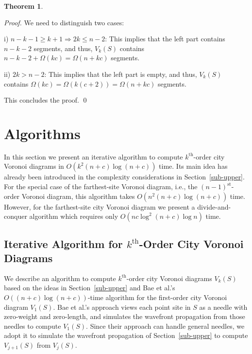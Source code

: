 \documentclass[11pt]{llncs}
\newtheorem{Theorem}{Theorem}
\newcommand{\kth}{\ensuremath{k^{\mathrm{th}}}\xspace}
\newcommand{\kthorder}{\kth-order\xspace}
\begin{document}
\begin{Theorem}\label{thm-lower-diagram}
\thmlowerdiagramtext
\end{Theorem}
\begin{proof}
We need to distinguish two cases:

i) $n-k-1\geq k+1 \Rightarrow 2k\leq n-2$:
This implies that the left part contains $n-k-2$ segments, and thus, $V_k(S)$ contains $n-k-2+\Omega(kc)=\Omega(n+kc)$ segments.

ii) $2k> n-2$:
This implies that the left part is empty, and thus,
$V_k(S)$ contains $\Omega(kc)=\Omega(k(c+2))=\Omega(n+kc)$ segments.

This concludes the proof. \qed
\end{proof}






\section{Algorithms}
\label{sec-algorithms}

In this section we present an iterative algorithm to compute \kthorder city Voronoi diagrams in
$O(k^2(n+c)\log (n+c))$ time. Its main idea has already been introduced in the complexity considerations in Section~\ref{sub-upper}.
For the special case of the
farthest-site Voronoi diagram, i.e., the $(n-1)^{\mathrm{st}}$-order Voronoi diagram,
this algorithm takes $O(n^2(n+c)\log(n+c))$ time. However, for the farthest-site city Voronoi diagram we present a divide-and-conquer algorithm which requires only $O(nc\log^2(n+c)\log n)$ time.


\subsection{Iterative Algorithm for $k^{\mathrm{th}}$-Order City Voronoi Diagrams}

We describe an algorithm to compute \kthorder city Voronoi diagrams $V_k(S)$ based on
the ideas in Section~\ref{sub-upper} and
Bae et al.'s \cite{BKC-09} $O((n+c)\log(n+c))$-time
algorithm for the first-order city Voronoi diagram $V_1(S)$.
Bae et al.'s approach views each point site in $S$ as a needle with zero-weight and zero-length,
and simulates the wavefront propagation from those needles to compute $V_1(S)$.
Since their approach can handle general needles,
we adopt it to simulate the wavefront propagation of Section~\ref{sub-upper} to compute $V_{j+1}(S)$ from $V_j(S)$.
\end{document}
